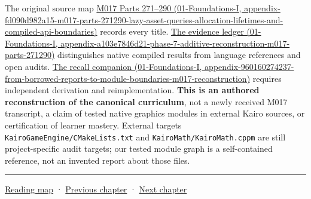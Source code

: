 The original source map \href{../01-Foundations-I/main.pdf\#nameddest=appendix-fd090d982a15-m017-parts-271290-lazy-asset-queries-allocation-lifetimes-and-compiled-api-boundaries}{M017 Parts 271--290 (01-Foundations-I, appendix-fd090d982a15-m017-parts-271290-lazy-asset-queries-allocation-lifetimes-and-compiled-api-boundaries)} records every title. \href{../01-Foundations-I/main.pdf\#nameddest=appendix-a103e7846d21-phase-7-additive-reconstruction-m017-parts-271290}{The evidence ledger (01-Foundations-I, appendix-a103e7846d21-phase-7-additive-reconstruction-m017-parts-271290)} distinguishes native compiled results from language references and open audits. \href{../01-Foundations-I/main.pdf\#nameddest=appendix-960160274237-from-borrowed-reports-to-module-boundaries-m017-reconstruction}{The recall companion (01-Foundations-I, appendix-960160274237-from-borrowed-reports-to-module-boundaries-m017-reconstruction)} requires independent derivation and reimplementation. \textbf{This is an authored reconstruction of the canonical curriculum}, not a newly received M017 transcript, a claim of tested native graphics modules in external Kairo sources, or certification of learner mastery. External targets \texttt{KairoGameEngine/CMakeLists.txt} and \texttt{KairoMath/KairoMath.cppm} are still project-specific audit targets; our tested module graph is a self-contained reference, not an invented report about those files.

\begin{center}\rule{0.5\linewidth}{0.5pt}\end{center}

\hyperref[volume-reading-map]{Reading map} · \hyperref[05-engine-i-ch005]{Previous chapter} · \hyperref[05-engine-i-ch007]{Next chapter}
